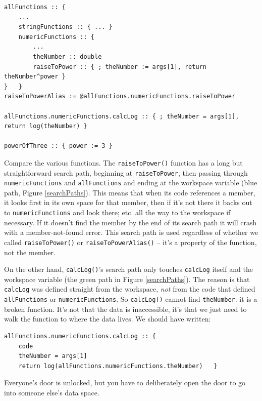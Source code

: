\documentclass{article}
\newenvironment{code}{
       \begin{list}{}{
               \setlength{\leftmargin}{.4in}
               \setlength{\rightmargin}{0in}
               \setlength{\topsep}{.2in}
       }
       \small
       \item[] }
       { \end{list}   }
\begin{document}
\begin{code} \begin{verbatim}
allFunctions :: {
    ...
    stringFunctions :: { ... }
    numericFunctions :: {
        ...
        theNumber :: double
        raiseToPower :: { ; theNumber := args[1], return theNumber^power }
}   }
raiseToPowerAlias := @allFunctions.numericFunctions.raiseToPower

allFunctions.numericFunctions.calcLog :: { ; theNumber = args[1], return log(theNumber) }

powerOfThree :: { power := 3 }
\end{verbatim} \end{code}

\noindent Compare the various functions.  The \verb#raiseToPower()# function has a long but straightforward search path, beginning at \verb#raiseToPower#, then passing through \verb#numericFunctions# and \verb#allFunctions# and ending at the workspace variable (blue path, Figure \ref{searchPaths}).  This means that when its code references a member, it looks first in its own space for that member, then if it's not there it backs out to \verb#numericFunctions# and look there; etc. all the way to the workspace if necessary.  If it doesn't find the member by the end of its search path it will crash with a member-not-found error.  This search path is used regardless of whether we called \verb#raiseToPower()# or \verb#raiseToPowerAlias()# -- it's a property of the function, not the member.

On the other hand, \verb#calcLog()#'s search path only touches \verb#calcLog# itself and the workspace variable (the green path in Figure \ref{searchPaths}).  The reason is that \verb#calcLog# was defined straight from the workspace, \emph{not} from the code that defined \verb#allFunctions# or \verb#numericFunctions#.  So \verb#calcLog()# cannot find \verb#theNumber#:  it is a broken function.  It's not that the data is inaccessible, it's that we just need to walk the function to where the data lives.  We should have written:

\begin{code} \begin{verbatim}
allFunctions.numericFunctions.calcLog :: {
    code
    theNumber = args[1]
    return log(allFunctions.numericFunctions.theNumber)   }
\end{verbatim} \end{code}

\noindent Everyone's door is unlocked, but you have to deliberately open the door to go into someone else's data space.
\end{document}
